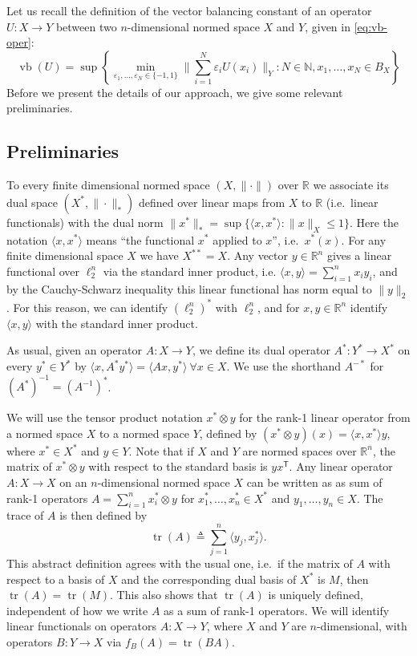 \documentclass[11pt]{article}
\newcommand{\R}{{\mathbb{R}}}
\newcommand{\T}{\mathsf T}
\newcommand\eps{\varepsilon}
\newcommand{\eqdef}{\triangleq}
\DeclareMathOperator{\vb}{vb}
\DeclareMathOperator{\tr}{tr}
\begin{document}
Let us recall the definition of the vector balancing constant of an
operator $U:X \to Y$ between two $n$-dimensional normed space $X$ and
$Y$, given in \eqref{eq:vb-oper}:
\[
\vb(U) = \sup\left\{
  \min_{\eps_1, \ldots, \eps_N \in \{-1, 1\}} 
  \biggl\|\sum_{i = 1}^N \eps_i U(x_i)\biggr\|_Y:
  N \in \mathbb{N}, x_1, \ldots, x_N \in B_X\right\}
\]
Before we present the details of our approach, we give some
relevant preliminaries. 

\subsection{Preliminaries}
\label{sect:fact-prelims}

To every finite dimensional normed space $(X, \|\cdot\|)$ over $\R$ we
associate its dual space $(X^*, \|\cdot\|_*)$ defined over linear maps
from $X$ to $\R$ (i.e.~linear functionals) with the dual norm
$\|x^*\|_* = \sup\{\langle x, x^*\rangle: \|x\|_X \le 1\}$. Here the
notation $\langle x, x^*\rangle$ means ``the functional $x^*$ applied
to $x$'', i.e.~$x^*(x)$. For any finite dimensional space $X$ we have
$X^{**} = X$. Any vector $y \in \R^n$ gives a linear functional over
$\ell_2^n$ via the standard inner product, i.e. $\langle x, y \rangle
= \sum_{i = 1}^n{x_i y_i}$, and by the Cauchy-Schwarz inequality this
linear functional has norm equal to $\|y\|_2$. For this reason, we can
identify $(\ell_2^n)^*$ with $\ell_2^n$, and for $x, y \in \R^n$
identify $\langle x , y \rangle$ with the standard inner product.

As usual, given an operator $A:X \to Y$, we define its dual operator
$A^*:Y^* \to X^*$ on every $y^* \in Y^*$ by $\langle x ,
A^*y^*\rangle = \langle Ax, y^*\rangle\ \forall x \in X$. We use the
shorthand $A^{-*}$ for $(A^{*})^{-1} = (A^{-1})^*$. 

We will use the tensor product notation $x^* \otimes y$ for the rank-1
linear operator from a normed space $X$ to a normed space $Y$, defined
by $(x^* \otimes y)(x) = \langle x, x^*\rangle y$, where $x^* \in X^*$
and $y \in Y$. Note that if $X$ and $Y$ are normed spaces over $\R^n$,
the matrix of $x^* \otimes y$ with respect to the standard basis is
$yx^\T$. Any linear operator $A:X \to X$ on an $n$-dimensional normed
space $X$ can be written as as sum of rank-1 operators $A = \sum_{i =
  1}^n{x^*_i \otimes y}$ for $x_1^*, \ldots, x_n^* \in X^*$ and $y_1,
\ldots, y_n \in X$. The trace of $A$ is then defined by
\[
\tr(A) \eqdef \sum_{j = 1}^n{\langle y_j, x^*_j \rangle}.
\]
This abstract definition agrees with the usual one, i.e.~if the matrix
of $A$ with respect to a basis of $X$ and the corresponding dual basis
of $X^*$ is $M$, then $\tr(A) = \tr(M)$. This also shows that $\tr(A)$
is uniquely defined, independent of how we write $A$ as a sum of
rank-1 operators. We will identify linear functionals on operators
$A:X \to Y$, where $X$ and $Y$ are $n$-dimensional, with operators
$B:Y \to X$ via $f_B(A) = \tr(BA)$.
\end{document}
